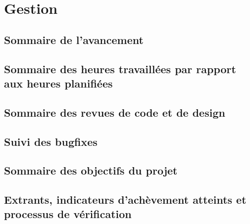 \section{Gestion}
\lipsumC

    \subsection{Sommaire de l'avancement}
    \lipsumC

    \subsection{Sommaire des heures travaillées par rapport aux heures planifiées}
    \lipsumC

    \subsection{Sommaire des revues de code et de design}
    \lipsumC

    \subsection{Suivi des bugfixes}
    \lipsumC

    \subsection{Sommaire des objectifs du projet}
    \lipsumC
    
    \subsection{Extrants, indicateurs d'achèvement atteints et processus de vérification}
    \lipsumC